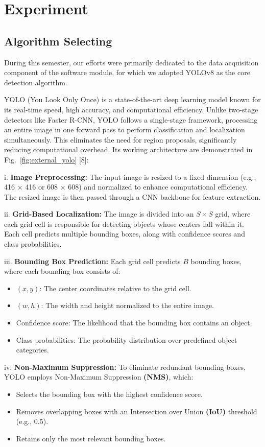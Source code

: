 \documentclass[journal,transmag]{IEEEtran}
\begin{document}
\section{Experiment}
\subsection{Algorithm Selecting}
During this semester, our efforts were primarily dedicated to the data acquisition component of the software module, for which we adopted YOLOv8 as the core detection algorithm.

YOLO (You Look Only Once) is a state-of-the-art deep learning model known for its real-time speed, high accuracy, and computational efficiency. Unlike two-stage detectors like Faster R-CNN, YOLO follows a single-stage framework, processing an entire image in one forward pass to perform classification and localization simultaneously. This eliminates the need for region proposals, significantly reducing computational overhead. Its working architecture are demonstrated in Fig.~\ref{fig:external_yolo} [8]:

i. \textbf{Image Preprocessing: } The input image is resized to a fixed dimension (e.g., 416 × 416 or 608 × 608) and normalized to enhance computational efficiency. The resized image is then passed through a CNN backbone for feature extraction.


ii. \textbf{Grid-Based Localization: } The image is divided into an $S \times S$ grid, where each grid cell is responsible for detecting objects whose centers fall within it. Each cell predicts multiple bounding boxes, along with confidence scores and class probabilities.

iii. \textbf{Bounding Box Prediction: } Each grid cell predicts $B$ bounding boxes, where each bounding box consists of:
\begin{itemize}
  \setlength{\itemindent}{1em} 
  \item $(x, y)$: The center coordinates relative to the grid cell.
  \item $(w, h)$: The width and height normalized to the entire image.
  \item Confidence score: The likelihood that the bounding box contains an object.
  \item Class probabilities: The probability distribution over predefined object categories.
\end{itemize}

iv. \textbf{Non-Maximum Suppression: } To eliminate redundant bounding boxes, YOLO employs Non-Maximum Suppression \textbf{(NMS)}, which:
\begin{itemize}
  \setlength{\itemindent}{2em} 
  \item Selects the bounding box with the highest confidence score.
  \item Removes overlapping boxes with an Intersection over Union \textbf{(IoU)} threshold (e.g., 0.5).
  \item Retains only the most relevant bounding boxes.
\end{itemize}
\end{document}
